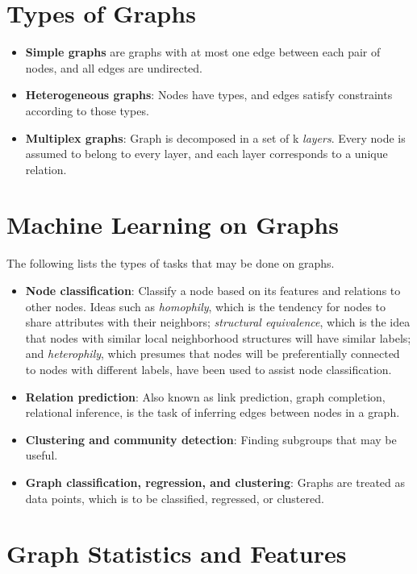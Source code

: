 \documentclass[twocolumn]{article}
\theoremstyle{plain}
\begin{document}
\section{Types of Graphs}

\begin{itemize}
    \item \label{simple_graph} \textbf{Simple graphs} are graphs with at most one edge between each pair of nodes, and all edges are undirected.
    \item \textbf{Heterogeneous graphs}: Nodes have types, and edges satisfy constraints according to those types.
    \item \textbf{Multiplex graphs}: Graph is decomposed in a set of k \textit{layers}. Every node is assumed to belong to every layer, and each layer corresponds to a unique relation.
\end{itemize}

\section{Machine Learning on Graphs}

The following lists the types of tasks that may be done on graphs.

\begin{itemize}
    \item \textbf{Node classification}: Classify a node based on its features and relations to other nodes. Ideas such as \textit{homophily}, which is the tendency for nodes to share attributes with their neighbors; \textit{structural equivalence}, which is the idea that nodes with similar local neighborhood structures will have similar labels; and \textit{heterophily}, which presumes that nodes will be preferentially connected to nodes with different labels, have been used to assist node classification.
    \item \textbf{Relation prediction}: Also known as link prediction, graph completion, relational inference, is the task of inferring edges between nodes in a graph.
    \item \textbf{Clustering and community detection}: Finding subgroups that may be useful.
    \item \textbf{Graph classification, regression, and clustering}: Graphs are treated as data points, which is to be classified, regressed, or clustered.
\end{itemize}

\section{Graph Statistics and Features}
\end{document}
